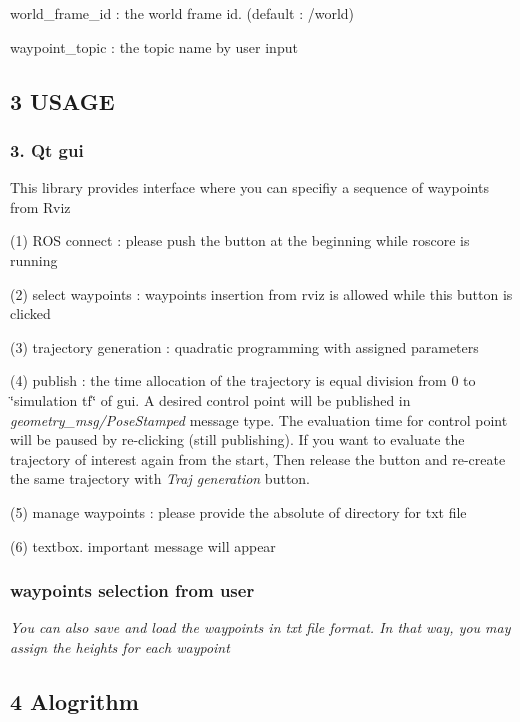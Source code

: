 \begin{DoxyItemize}
\item world\+\_\+frame\+\_\+id \+: the world frame id. (default \+: /world)
\item waypoint\+\_\+topic \+: the topic name by user input
\end{DoxyItemize}

\subsection*{3 U\+S\+A\+GE}

\subsubsection*{3. Qt gui}



This library provides interface where you can specifiy a sequence of waypoints from Rviz

(1) R\+OS connect \+: please push the button at the beginning while roscore is running

(2) select waypoints \+: waypoints insertion from rviz is allowed while this button is clicked

(3) trajectory generation \+: quadratic programming with assigned parameters

(4) publish \+: the time allocation of the trajectory is equal division from 0 to \char`\"{}simulation tf\char`\"{} of gui. A desired control point will be published in {\itshape geometry\+\_\+msg/\+Pose\+Stamped} message type. The evaluation time for control point will be paused by re-\/clicking (still publishing). If you want to evaluate the trajectory of interest again from the start, Then release the button and re-\/create the same trajectory with {\itshape Traj generation} button.

(5) manage waypoints \+: please provide the absolute of directory for txt file

(6) textbox. important message will appear

\subsubsection*{waypoints selection from user}



{\itshape You can also save and load the waypoints in txt file format. In that way, you may assign the heights for each waypoint}

\subsection*{4 Alogrithm}

